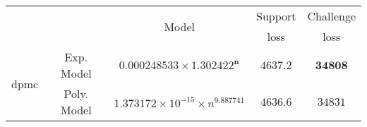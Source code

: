 \begin{tabular}{ccccc} 
\hline 
 &  & \multirow{2}{*}{Model} & Support & Challenge\tabularnewline 
 &  &  & loss  & loss\tabularnewline 
\hline 
\hline 
\multirow{2}{*}{dpmc} & Exp. Model & $\mathbf{0.000248533\times 1.302422^{n}}$ & $\mathbf{4637.2}$ & $\mathbf{34808}$ \tabularnewline 
 & Poly. Model & $1.373172\times10^{-15}\times n^{9.887741}$ & $4636.6$ & $34831$ \tabularnewline 
\hline 
\end{tabular} 

